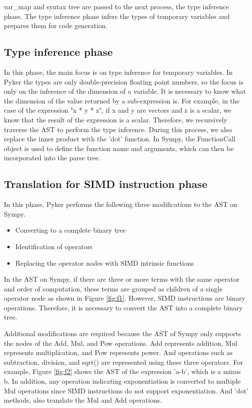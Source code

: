 \documentclass[ams]{article}
\begin{document}
var\_map and syntax tree are passed to the next process, the type inference phase. The type inference phase infers the types of temporary variables and prepares them for code generation.

\subsection{Type inference phase}
In this phase, the main focus is on type inference for temporary variables. 
In Pyker the types are only double-precision floating point numbers, so the focus is only on the inference of the dimension of a variable. It is necessary to know what the dimension of the value returned by a sub-expression is.
For example, in the case of the expression "x * y * z", if x and y are vectors and z is a scalar, we know that the result of the expression is a scalar. Therefore, we recursively traverse the AST to perform the type inference. During this process, we also replace the inner product with the 'dot' function. In Sympy, the FunctionCall object is used to define the function name and arguments, which can then be incorporated into the parse tree.

\subsection{Translation for SIMD instruction phase}
In this phase, Pyker performs the following three modifications to the  AST on Sympy.
\begin{itemize}
  \item Converting to a complete binary tree
  \item Identification of operators
  \item Replacing the operator nodes with SIMD intrinsic functions

\end{itemize}

In the AST on Sympy, if there are three or more terms with the same operator and order of computation, these terms are grouped as children of a single operator node as shown in Figure \ref{fig:f1}. However, SIMD instructions are binary operations. Therefore, it is necessary to convert the AST into a complete binary tree.

Additional modifications are required because the AST of Sympy only supports the nodes of the Add, Mul, and Pow operations. Add represents addition, Mul represents multiplication, and Pow represents power. And operations such as subtraction, division, and sqrt() are represented using these three operators. For example, Figure \ref{fig:f2} shows the AST of the expression 'a-b', which is a minus b. In addition, any operation indicating exponentiation is converted to multiple Mul operations since SIMD instructions do not support exponentiation.
And 'dot' methods, also translate the Mul and Add operations.
\end{document}
